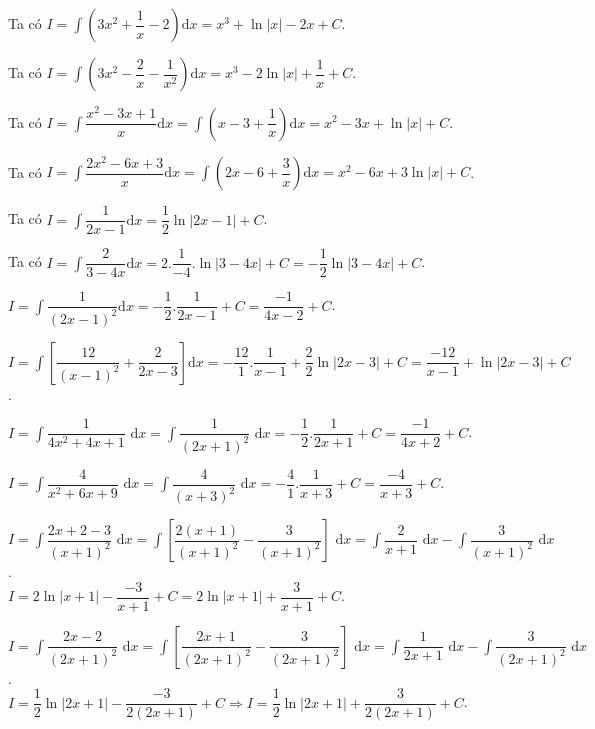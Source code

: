 \begin{vd}
{\begin{listEX}[1]
            \item Ta có $I=\displaystyle\int{\left( 3x^2+\dfrac{1}{x}-2 \right)\text{d}x}=x^3+\ln \left| x \right|-2x+C$.
            \item Ta có $I=\displaystyle\int{\left( 3x^2-\dfrac{2}{x}-\dfrac{1}{x^2} \right)\text{d}x}=x^3-2\ln \left| x \right|+\dfrac{1}{x}+C$.
            \item Ta có $I=\displaystyle\int{\dfrac{x^2-3x+1}{x}\text{d}x}=\displaystyle\int{\left( x-3+\dfrac{1}{x} \right)\text{d}x}=x^2-3x+\ln \left| x \right|+C$.
            \item Ta có $I=\displaystyle\int{\dfrac{2x^2-6x+3}{x}\text{d}x}=\displaystyle\int{\left( 2x-6+\dfrac{3}{x} \right)\text{d}x}=x^2-6x+3\ln \left| x \right|+C$.
            \item Ta có $I=\displaystyle\int{\dfrac{1}{2x-1}\text{d}x}=\dfrac{1}{2}\ln \left| 2x-1 \right|+C$.
            \item Ta có $I=\displaystyle\int{\dfrac{2}{3-4x}\text{d}x}=2.\dfrac{1}{-4}.\ln \left| 3-4x \right|+C=-\dfrac{1}{2}\ln \left| 3-4x \right|+C$.
            \item $I=\displaystyle\int{\dfrac{1}{{{\left( 2x-1 \right)}^2}}\text{d}x=-\dfrac{1}{2}}.\dfrac{1}{2x-1}+C=\dfrac{-1}{4x-2}+C$.
            \item $I=\displaystyle\int{\left[ \dfrac{12}{{{\left( x-1 \right)}^2}}+\dfrac{2}{2x-3} \right]\text{d}x=-\dfrac{12}{1}}.\dfrac{1}{x-1}+\dfrac{2}{2}\ln \left| 2x-3 \right|+C=\dfrac{-12}{x-1}+\ln \left| 2x-3 \right|+C$.
            \item $I=\displaystyle\int{\dfrac{1}{4x^2+4x+1}\textrm{ d}x=}\displaystyle\int{\dfrac{1}{{{\left( 2x+1 \right)}^2}}\textrm{ d}x=-\dfrac{1}{2}}.\dfrac{1}{2x+1}+C=\dfrac{-1}{4x+2}+C$.
            \item $I=\displaystyle\int{\dfrac{4}{x^2+6x+9}\textrm{ d}x=}\displaystyle\int{\dfrac{4}{{{\left( x+3 \right)}^2}}\textrm{ d}x=-\dfrac{4}{1}}.\dfrac{1}{x+3}+C=\dfrac{-4}{x+3}+C$.
            \item $I=\displaystyle\int{\dfrac{2x+2-3}{{{\left( x+1 \right)}^2}}\textrm{ d}x=\displaystyle\int{\left[ \dfrac{2(x+1)}{{{\left( x+1 \right)}^2}}-\dfrac{3}{{{\left( x+1 \right)}^2}} \right]}}\textrm{ d}x=\displaystyle\int{\dfrac{2}{x+1}\textrm{ d}x-\displaystyle\int{\dfrac{3}{{{\left( x+1 \right)}^2}}\textrm{ d}x}}$.\\
            $I=2\ln \left| x+1 \right|-\dfrac{-3}{x+1}+C=2\ln \left| x+1 \right|+\dfrac{3}{x+1}+C$.
            \item $I=\displaystyle\int{\dfrac{2x-2}{{{\left( 2x+1 \right)}^2}}\textrm{ d}x=\displaystyle\int{\left[ \dfrac{2x+1}{{{\left( 2x+1 \right)}^2}}-\dfrac{3}{{{\left( 2x+1 \right)}^2}} \right]}}\textrm{ d}x = \displaystyle\int{\dfrac{1}{2x+1}\textrm{ d}x-\displaystyle\int{\dfrac{3}{{{\left( 2x+1 \right)}^2}}\textrm{ d}x}}$.\\
            $I=\dfrac{1}{2}\ln \left| 2x+1 \right|-\dfrac{-3}{2\left( 2x+1 \right)}+C \Rightarrow I=\dfrac{1}{2}\ln \left| 2x+1 \right|+\dfrac{3}{2\left( 2x+1 \right)}+C$.
        \end{listEX}
		}
\end{vd}
